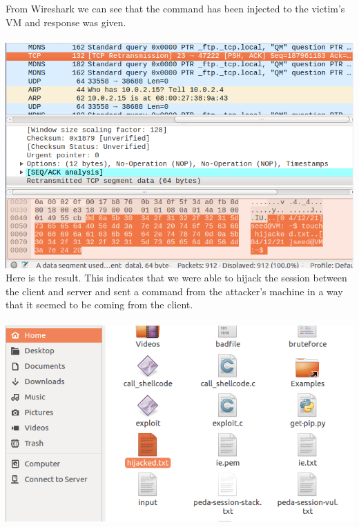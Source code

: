 \documentclass[a4paper]{article}
\begin{document}
From Wireshark we can see that the command has been injected to the victim's VM and response was given.\\\\
\pagebreak
\includegraphics[scale=0.7]{1/26.png}
\\Here is the result. This indicates that we were able to hijack the session between the client and server and sent a command 
from the attacker’s machine in a way that it seemed to be coming from the client.\\\\
\includegraphics[scale=0.7]{1/27.png}\\\\
\end{document}
